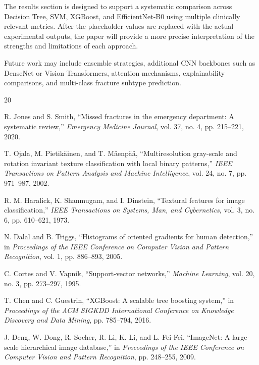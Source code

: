 \documentclass[conference]{IEEEtran}
\begin{document}
The results section is designed to support a systematic comparison across Decision Tree, SVM, XGBoost, and EfficientNet-B0 using multiple clinically relevant metrics. After the placeholder values are replaced with the actual experimental outputs, the paper will provide a more precise interpretation of the strengths and limitations of each approach.

Future work may include ensemble strategies, additional CNN backbones such as DenseNet or Vision Transformers, attention mechanisms, explainability comparisons, and multi-class fracture subtype prediction.

\begin{thebibliography}{20}

R. Jones and S. Smith, ``Missed fractures in the emergency department: A systematic review,'' \textit{Emergency Medicine Journal}, vol. 37, no. 4, pp. 215--221, 2020.

T. Ojala, M. Pietikäinen, and T. Mäenpää, ``Multiresolution gray-scale and rotation invariant texture classification with local binary patterns,'' \textit{IEEE Transactions on Pattern Analysis and Machine Intelligence}, vol. 24, no. 7, pp. 971--987, 2002.

R. M. Haralick, K. Shanmugam, and I. Dinstein, ``Textural features for image classification,'' \textit{IEEE Transactions on Systems, Man, and Cybernetics}, vol. 3, no. 6, pp. 610--621, 1973.

N. Dalal and B. Triggs, ``Histograms of oriented gradients for human detection,'' in \textit{Proceedings of the IEEE Conference on Computer Vision and Pattern Recognition}, vol. 1, pp. 886--893, 2005.

C. Cortes and V. Vapnik, ``Support-vector networks,'' \textit{Machine Learning}, vol. 20, no. 3, pp. 273--297, 1995.

T. Chen and C. Guestrin, ``XGBoost: A scalable tree boosting system,'' in \textit{Proceedings of the ACM SIGKDD International Conference on Knowledge Discovery and Data Mining}, pp. 785--794, 2016.

J. Deng, W. Dong, R. Socher, R. Li, K. Li, and L. Fei-Fei, ``ImageNet: A large-scale hierarchical image database,'' in \textit{Proceedings of the IEEE Conference on Computer Vision and Pattern Recognition}, pp. 248--255, 2009.


\end{thebibliography}
\end{document}
